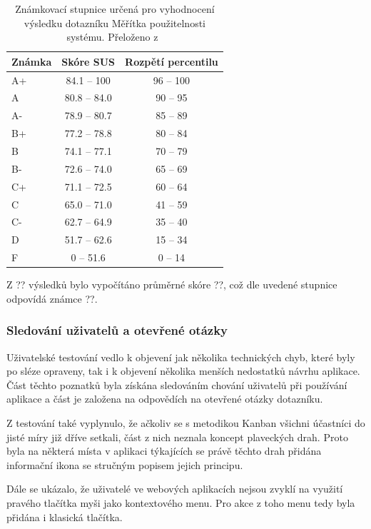 \begin{table}[H]
\centering
\label{tab:sus}
\caption{Známkovací stupnice určená pro vyhodnocení výsledku dotazníku Měřítka použitelnosti systému. Přeloženo z~\cite{bib:sus-statistics}}
\begin{tabular}{|l|c|c|}
\hline
Známka & Skóre SUS  & Rozpětí percentilu  \\
\hline
A+    & 84.1 – 100  & 96 – 100          \\
A     & 80.8 – 84.0 & 90 – 95           \\
A-    & 78.9 – 80.7 & 85 – 89           \\
B+    & 77.2 – 78.8 & 80 – 84           \\
B     & 74.1 – 77.1 & 70 – 79           \\
B-    & 72.6 – 74.0 & 65 – 69           \\
C+    & 71.1 – 72.5 & 60 – 64           \\
C     & 65.0 – 71.0 & 41 – 59           \\
C-    & 62.7 – 64.9 & 35 – 40           \\
D     & 51.7 – 62.6 & 15 – 34           \\
F     & 0 – 51.6    & 0 – 14            \\
\hline
\end{tabular}
\end{table}

Z ?? výsledků bylo vypočítáno průměrné skóre ??, což dle uvedené stupnice odpovídá známce ??.

\blindtext


\subsubsection{Sledování uživatelů a otevřené otázky}
Uživatelské testování vedlo k objevení jak několika technických chyb, které byly po sléze opraveny, tak i k objevení několika menších nedostatků návrhu aplikace. Část těchto poznatků byla získána sledováním chování uživatelů při používání aplikace a část je založena na odpovědích na otevřené otázky dotazníku. 

\blindtext

Z testování také vyplynulo, že ačkoliv se s metodikou Kanban všichni účastníci do jisté míry již dříve setkali, část z nich neznala koncept plaveckých drah. Proto byla na některá místa v aplikaci týkajících se právě těchto drah přidána informační ikona se stručným popisem jejich principu.

Dále se ukázalo, že uživatelé ve webových aplikacích nejsou zvyklí na využití pravého tlačítka myši jako kontextového menu. Pro akce z toho menu tedy byla přidána i klasická tlačítka. 


